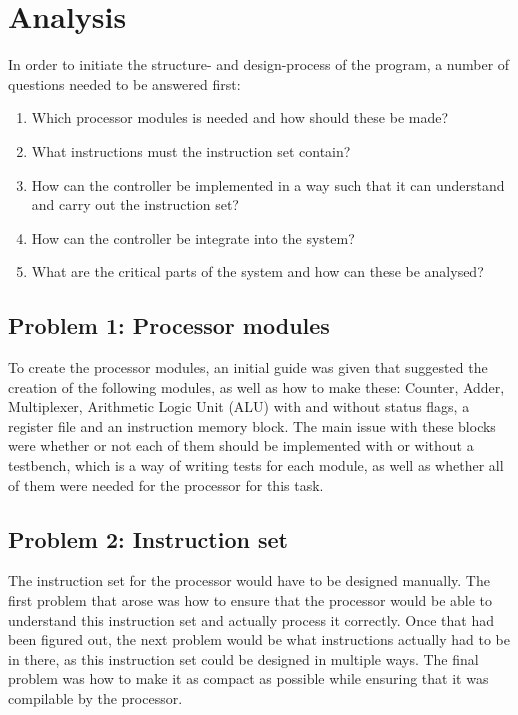 \documentclass[12pt,a4paper]{article}
\begin{document}
\section{Analysis}
 	In order to initiate the structure- and design-process of the program, a number of questions needed to be answered first:\\
 	
 	\begin{enumerate}
	\item Which processor modules is needed and how should these be made?
	\item What instructions must the instruction set contain?
	\item How can the controller be implemented in a way such that it can understand and carry out the instruction set?
	\item How can the controller be integrate into the system?
	\item What are the critical parts of the system and how can these be analysed?
\end{enumerate}

\subsection{Problem 1: Processor modules}
	To create the processor modules, an initial guide was given that suggested the creation of the following modules, as well as how to make these: Counter, Adder, Multiplexer, Arithmetic Logic Unit (ALU) with and without status flags, a register file and an instruction memory block. The main issue with these blocks were whether or not each of them should be implemented with or without a testbench, which is a way of writing tests for each module, as well as whether all of them were needed for the processor for this task.\\
\subsection{Problem 2: Instruction set}
	The instruction set for the processor would have to be designed manually. The first problem that arose was how to ensure that the processor would be able to understand this instruction set and actually process it correctly. Once that had been figured out, the next problem would be what instructions actually had to be in there, as this instruction set could be designed in multiple ways. The final problem was how to make it as compact as possible while ensuring that it was compilable by the processor.\\
	
\end{document}
